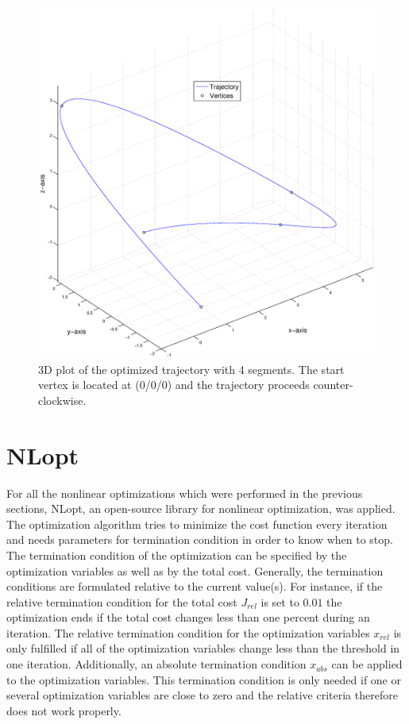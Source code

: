 \begin{figure}[H]
   \centering
   \includegraphics[trim = 30mm 30mm 33mm 30mm,clip,width=1\textwidth]{pics/4SegOptiSpace.eps}
   \caption{3D plot of the optimized trajectory with 4 segments. The start vertex is located at (0/0/0) and the trajectory proceeds counter-clockwise.}
    \label{pic:optiSpace} 
\end{figure}
\newpage


\section{NLopt}\label{sec:NLopt}

For all the nonlinear optimizations which were performed in the previous sections, NLopt, an open-source library for nonlinear optimization, was applied. The optimization algorithm tries to minimize the cost function every iteration and needs parameters for termination condition in order to know when to stop.\newline
The termination condition of the optimization can be specified by the optimization variables as well as by the total cost. Generally, the termination conditions are formulated relative to the current value(s). For instance, if the relative termination condition for the total cost $J_{rel}$ is set to $0.01$ the optimization ends if the total cost changes less than one percent during an iteration. The relative termination condition for the optimization variables $x_{rel}$ is only fulfilled if all of the optimization variables change less than the threshold in one iteration.
Additionally, an absolute termination condition $x_{abs}$ can be applied to the optimization variables. This termination condition is only needed if one or several optimization variables are close to zero and the relative criteria therefore does not work properly. \newline 

